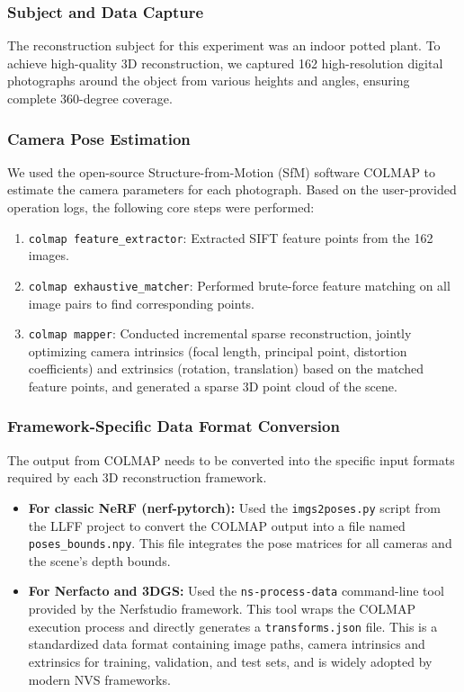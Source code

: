 \documentclass[11pt]{article}
\begin{document}
\subsubsection{Subject and Data Capture}
The reconstruction subject for this experiment was an indoor potted plant. To achieve high-quality 3D reconstruction, we captured 162 high-resolution digital photographs around the object from various heights and angles, ensuring complete 360-degree coverage.

\subsubsection{Camera Pose Estimation}
We used the open-source Structure-from-Motion (SfM) software COLMAP to estimate the camera parameters for each photograph. Based on the user-provided operation logs, the following core steps were performed:
\begin{enumerate}
    \item \texttt{colmap feature\_extractor}: Extracted SIFT feature points from the 162 images.
    \item \texttt{colmap exhaustive\_matcher}: Performed brute-force feature matching on all image pairs to find corresponding points.
    \item \texttt{colmap mapper}: Conducted incremental sparse reconstruction, jointly optimizing camera intrinsics (focal length, principal point, distortion coefficients) and extrinsics (rotation, translation) based on the matched feature points, and generated a sparse 3D point cloud of the scene.
\end{enumerate}

\subsubsection{Framework-Specific Data Format Conversion}
The output from COLMAP needs to be converted into the specific input formats required by each 3D reconstruction framework.
\begin{itemize}
    \item \textbf{For classic NeRF (nerf-pytorch):} Used the \texttt{imgs2poses.py} script from the LLFF project to convert the COLMAP output into a file named \texttt{poses\_bounds.npy}. This file integrates the pose matrices for all cameras and the scene's depth bounds.
    \item \textbf{For Nerfacto and 3DGS:} Used the \texttt{ns-process-data} command-line tool provided by the Nerfstudio framework. This tool wraps the COLMAP execution process and directly generates a \texttt{transforms.json} file. This is a standardized data format containing image paths, camera intrinsics and extrinsics for training, validation, and test sets, and is widely adopted by modern NVS frameworks.
\end{itemize}
\end{document}
